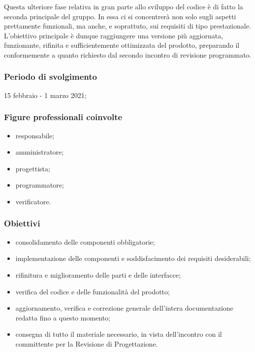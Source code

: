 Questa ulteriore fase relativa in gran parte allo sviluppo del codice è di fatto la seconda  principale del gruppo. In essa ci si concentrerà non solo sugli aspetti prettamente funzionali, ma anche, e soprattuto, sui requisiti di tipo prestazionale. L'obiettivo principale è dunque raggiungere una versione più aggiornata, funzionante, rifinita e sufficientemente ottimizzata del prodotto, preparando il  conformemente a quanto richiesto dal secondo incontro di revisione programmato.
        
        \subsubsection{Periodo di svolgimento}
        15 febbraio - 1 marzo 2021;
        
        \subsubsection{Figure professionali coinvolte}
            \begin{itemize}
                \item responsabile;
                \item amministratore;
                \item progettista;
                \item programmatore;
                \item verificatore.
            \end{itemize}

        \subsubsection{Obiettivi}
        \begin{itemize}
            \item consolidamento delle componenti obbligatorie;
            \item implementazione delle componenti e soddisfacimento dei requisiti desiderabili;
            \item rifinitura e miglioramento delle parti e delle interfacce;
            \item verifica del codice e delle funzionalità del prodotto;
            \item aggiornamento, verifica e correzione generale dell'intera documentazione redatta fino a questo momento;
            \item consegna di tutto il materiale necessario, in vista dell'incontro con il committente per la Revisione di Progettazione.
        \end{itemize}